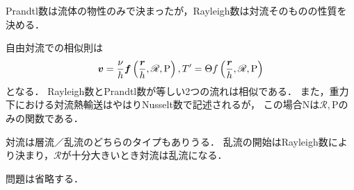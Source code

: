 Prandtl数は流体の物性のみで決まったが，Rayleigh数は対流そのものの性質を決める．



自由対流での相似則は
\begin{equation}
    \vb*{v} = \frac{\nu}{h} \vb*{f} \left( \frac{\vb*{r}}{h}, \mathscr{R}, \mathrm{P} \right),
    T' = \Theta f \left( \frac{\vb*{r}}{h}, \mathscr{R}, \mathrm{P} \right)
\end{equation}
となる．
Rayleigh数とPrandtl数が等しい2つの流れは相似である．
また，重力下における対流熱輸送はやはりNusselt数で記述されるが，
この場合$\mathrm{N}$は$\mathscr{R}, \mathrm{P}$のみの関数である．



対流は層流／乱流のどちらのタイプもありうる．
乱流の開始はRayleigh数により決まり，$\mathscr{R}$が十分大きいとき対流は乱流になる．





問題は省略する．



\BackToTheToc